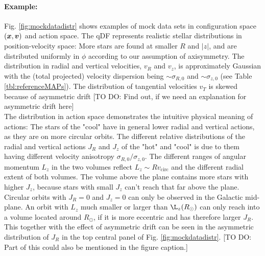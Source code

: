 
\paragraph{Example:} Fig. \ref{fig:mockdatadistr} shows examples of mock data sets in configuration space $(\boldsymbol{x},\boldsymbol{v})$ and action space.  The qDF represents realistic stellar distributions in position-velocity space: More stars are found at smaller $R$ and $|z|$, and are distributed uniformly in $\phi$ according to our assumption of axisymmetry. The distribution in radial and vertical velocities, $v_R$ and $v_z$, is approximately Gaussian with the (total projected) velocity dispersion being $\sim\sigma_{R,0}$ and $\sim\sigma_{z,0}$ (see Table \ref{tbl:referenceMAPs}). The distribution of tangential velocities $v_T$ is skewed because of asymmetric drift [TO DO: Find out, if we need an explanation for asymmetric drift here]
\\The distribution in action space demonstrates the intuitive physical meaning of actions: The stars of the "cool" \MAP have in general lower radial and vertical actions, as they are on more circular orbits. The different relative distributions of the radial and vertical actions $J_R$ and $J_z$ of the "hot" and "cool" \MAP is due to them having different velocity anisotropy $\sigma_{R,0}/\sigma_{z,0}$. The different ranges of angular momentum $L_z$ in the two volumes reflect $L_z \sim R  v_\text{circ}$ and the different radial extent of both volumes. The volume above the plane contains more stars with higher $J_z$, because stars with small $J_z$ can't reach that far above the plane. Circular orbits with $J_R = 0$ and $J_z = 0$ can only be observed in the Galactic mid-plane. An orbit with $L_z$ much smaller or larger than $\L_z(R_\odot)$ can only reach into a volume located around $R_\odot$, if it is more eccentric and has therefore larger $J_R$. This together with the effect of asymmetric drift can be seen in the asymmetric distribution of $J_R$ in the top central panel of Fig. \ref{fig:mockdatadistr}. [TO DO: Part of this could also be mentioned in the figure caption.]





